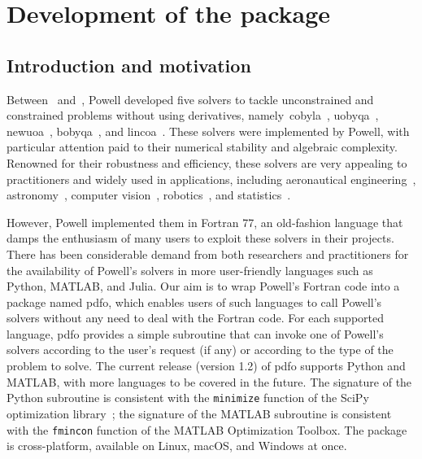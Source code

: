%
%
%
\chapter{Development of the  package}
\label{ch:pdfo}


\section{Introduction and motivation}

Between~\citeyear{Powell_1994} and~\citeyear{Powell_2015}, Powell developed five solvers to tackle unconstrained and constrained problems without using derivatives, namely~\gls{cobyla}~\cite{Powell_1994}, \gls{uobyqa}~\cite{Powell_2002}, \gls{newuoa}~\cite{Powell_2006}, \gls{bobyqa}~\cite{Powell_2009}, and \gls{lincoa}~\cite{Powell_2015}.
These solvers were implemented by Powell, with particular attention paid to their numerical stability and algebraic complexity.
Renowned for their robustness and efficiency, these solvers are very appealing to practitioners and widely used in applications, including aeronautical engineering~\cite{Gallard_Etal_2018}, astronomy~\cite{Biviano_Etal_2013,Mamon_Biviano_Boue_2013}, computer vision~\cite{Izadinia_Shan_Seitz_2017}, robotics~\cite{Mombaur_Truong_Laumond_2010}, and statistics~\cite{Bates_Etal_2015}.

However, Powell implemented them in Fortran 77, an old-fashion language that damps the enthusiasm of many users to exploit these solvers in their projects.
There has been considerable demand from both researchers and practitioners for the availability of Powell's solvers in more user-friendly languages such as Python, MATLAB, and Julia.
Our aim is to wrap Powell's Fortran code into a package named \gls{pdfo}, which enables users of such languages to call Powell's solvers without any need to deal with the Fortran code.
For each supported language, \gls{pdfo} provides a simple subroutine that can invoke one of Powell's solvers according to the user's request (if any) or according to the type of the problem to solve.
The current release (version 1.2) of \gls{pdfo} supports Python and MATLAB, with more languages to be covered in the future.
The signature of the Python subroutine is consistent with the \texttt{minimize} function of the SciPy optimization library~\cite{Virtanen_Etal_2020};
the signature of the MATLAB subroutine is consistent with the \texttt{fmincon} function of the MATLAB Optimization Toolbox.
The package is cross-platform, available on Linux, macOS, and Windows at once.

